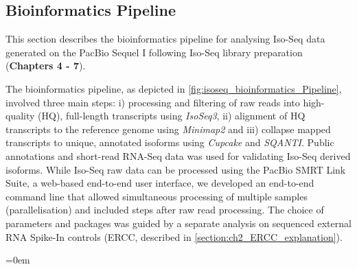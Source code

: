 \clearpage
\subsection{Bioinformatics Pipeline} 
\label{section:isoseq_bioinformatics}
This section describes the bioinformatics pipeline for analysing Iso-Seq data generated on the PacBio Sequel I following Iso-Seq library preparation (\textbf{Chapters 4 - 7}). 

The bioinformatics pipeline, as depicted in \cref{fig:isoseq_bioinformatics_Pipeline}, involved three main steps: i) processing and filtering of raw reads into high-quality (HQ), full-length transcripts using \textit{IsoSeq3}, ii) alignment of HQ transcripts to the reference genome using \textit{Minimap2} and iii) collapse mapped transcripts to unique, annotated isoforms using \textit{Cupcake} and \textit{SQANTI}. Public annotations and short-read RNA-Seq data was used for validating Iso-Seq derived isoforms. While Iso-Seq raw data can be processed using the PacBio SMRT Link Suite, a web-based end-to-end user interface, we developed an end-to-end command line that allowed simultaneous processing of multiple samples (parallelisation) and included steps after raw read processing. The choice of parameters and packages was guided by a separate analysis on sequenced external RNA Spike-In controls (ERCC, described in \cref{section:ch2_ERCC_explanation}). 

\begingroup
\parindent=0em
\localtableofcontents 
\endgroup


